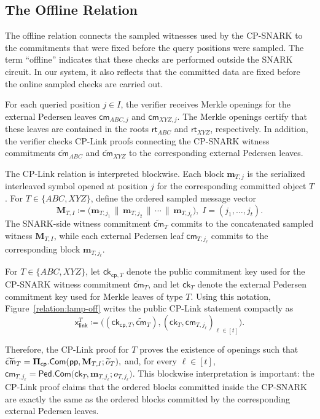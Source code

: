 \documentclass[conference,compsoc]{IEEEtran}
\newif\ifshowrevisions
\newenvironment{revblock}[1][]
  {%
    \ifshowrevisions
      \begin{tcolorbox}[
        breakable,
        colback=revisionyellow,
        colframe=revisionyellow,
        boxrule=0pt,
        arc=0pt,
        left=2pt,
        right=2pt,
        top=2pt,
        bottom=2pt,
        before skip=2pt,
        after skip=2pt,
        #1
      ]
    \fi
  }
  {%
    \ifshowrevisions
      \end{tcolorbox}
    \fi
  }
\newcommand{\para}{\textsf{pp}}
\newcommand{\cm}{\textsf{cm}}
\newcommand{\rt}{\textsf{rt}}
\newcommand{\ck}{\textsf{ck}}
\newcommand{\pedC}{\textsf{Ped.Com}}
\newcommand{\vect}{\mathbf}         %
\newcommand{\bPi}{{\bf \Pi}}
\newcommand{\com}{{\sf Com}}
\newcommand{\cp}{{\mathsf{cp}}}
\renewcommand{\ck}{{\textsf{ck}}}
\newcommand{\stmt}{\mathsf{x}}      %
\theoremstyle{plain}
\theoremstyle{definition}
\theoremstyle{remark}
\begin{document}
\subsection{The Offline Relation}
\label{sec:openings-and-cplink}

The offline relation connects the sampled witnesses used by the
CP-SNARK to the commitments that were fixed before the query positions were
sampled.  The term ``offline'' indicates that these checks are performed outside the SNARK circuit. In our system, it also reflects that the committed data are fixed before the online sampled checks are carried out.

For each queried position \(j\in I\), the verifier receives Merkle openings for the external Pedersen leaves $\cm_{ABC,j}$ and $\cm_{XYZ,j}$.
The Merkle openings certify that these leaves are contained in the roots
\(\rt_{ABC}\) and \(\rt_{XYZ}\), respectively.  In addition, the verifier checks
CP-Link proofs connecting the CP-SNARK witness commitments
\(\widetilde{\cm}_{ABC}\) and \(\widetilde{\cm}_{XYZ}\) to the corresponding
external Pedersen leaves.

The CP-Link relation is interpreted blockwise.  Each block
\(\vect{m}_{T,j}\) is the serialized interleaved symbol opened at position
\(j\) for the corresponding committed object \(T\).  For
\(T\in\{ABC,XYZ\}\), define the ordered sampled message vector
\[
  \vect{M}_{T,I}
  \coloneqq
  \big(
    \vect{m}_{T,j_1}
    \,\|\,
    \vect{m}_{T,j_2}
    \,\|\,
    \cdots
    \,\|\,
    \vect{m}_{T,j_t}
  \big),
  \;
  I=(j_1,\ldots,j_t).
\]
The SNARK-side witness commitment \(\widetilde{\cm}_{T}\) commits to the
concatenated sampled witness \(\vect{M}_{T,I}\), while each external Pedersen
leaf \(\cm_{T,j_\ell}\) commits to the corresponding block
\(\vect{m}_{T,j_\ell}\).

\begin{revblock}
For \(T\in\{ABC,XYZ\}\), let \(\ck_{\cp,T}\) denote the public commitment
key used for the CP-SNARK witness commitment \(\widetilde{\cm}_{T}\), and let
\(\ck_T\) denote the external Pedersen commitment key used for Merkle leaves
of type \(T\). Using this notation, Figure~\ref{relation:lamp-off} writes the
public CP-Link statement compactly as
\[
  \stmt_{\mathsf{link}}^T
  \coloneqq
  \big(
    (\ck_{\cp,T},\widetilde{\cm}_{T}),
    (\ck_T,\cm_{T,j_\ell})_{\ell\in[t]}
  \big).
\]
\end{revblock}
Therefore, the CP-Link proof for \(T\) proves the existence of openings such that
  $\widetilde{\cm}_{T}
  =
  \bPi_{\cp}.\com(
    \para,
    \vect{M}_{T,I};
    \widetilde{o}_{T}
  ),$
and, for every \(\ell\in[t]\),
  $\cm_{T,j_\ell}
  =
  \pedC
  \big(
    \ck_T,
    \vect{m}_{T,j_\ell};
    o_{T,j_\ell}
  \big).$
This blockwise interpretation is important: the CP-Link proof claims that the ordered blocks committed inside the CP-SNARK are exactly the same as the ordered blocks committed by the corresponding external Pedersen leaves.
\end{document}

